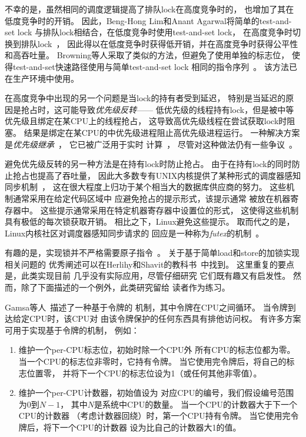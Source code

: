 不幸的是，虽然相同的调度逻辑提高了排队lock在高度竞争时的，
也增加了其在低度竞争时的开销。
因此，Beng-Hong Lim和Anant Agarwal将简单的test-and-set lock
与排队lock相结合，在低度竞争时使用test-and-set lock，
在高度竞争时切换到排队lock~\cite{BengHongLim94}，
因此得以在低度竞争时获得低开销，并在高度竞争时获得公平性和高吞吐量。
Browning等人采取了类似的方法，但避免了使用单独的标志位，
使得test-and-set快速路径使用与简单test-and-set lock
相同的指令序列~\cite{LukeBrowning2005SimpleLockNUMAAware}。
该方法已在生产环境中使用。

在高度竞争中出现的另一个问题是当lock的持有者受到延迟，
特别是当延迟的原因是抢占时，这可能导致\emph{优先级反转}——
低优先级的线程持有lock，但是被中等优先级且绑定在某CPU上的线程抢占，
这导致高优先级线程在尝试获取lock时阻塞。
结果是绑定在某CPU的中优先级进程阻止高优先级进程运行。
一种解决方案是\emph{优先级继承}~\cite{Lampson1980Mesa}，
它已被广泛用于实时
计算~\cite{LuiSha1990PriorityInheritance,JonathanCorbet2006PriorityInheritance}，
尽管对这种做法仍有一些争议~\cite{Yodaiken2004FSM,DougLocke2002a}。

避免优先级反转的另一种方法是在持有lock时防止抢占。
由于在持有lock的同时防止抢占也提高了吞吐量，
因此大多数专有UNIX内核提供了某种形式的调度器感知
同步机制~\cite{Kontothanassis97a}，
这在很大程度上归功于某个相当大的数据库供应商的努力。
这些机制通常采用在给定代码区域中
应避免抢占的提示形式，该提示通常
被放在机器寄存器中。
这些提示通常采用在特定机器寄存器中设置位的形式，
这使得这些机制具有极低的每次锁获取开销。
相比之下，Linux避免这些提示。
取而代之的是，Linux内核社区对调度器感知同步请求的
回应是一种称为\emph{futex}的机制~\cite{HubertusFrancke2002Futex,IngoMolnar2006RobustFutexes,StevenRostedt2006piFutexes,UlrichDrepper2011Futexes}。

有趣的是，实现锁并不严格需要原子指令~\cite{Dijkstra65a,Lamport74a}。
关于基于简单load和store的加锁实现相关问题的
优秀阐述可以在Herlihy和Shavit的教科书~\cite{HerlihyShavit2008Textbook,HerlihyShavit2020Textbook}中找到。
这里重复的要点是，此类实现目前
几乎没有实际应用，尽管仔细研究
它们既有趣又有启发性。
然而，除了下面描述的一个例外，此类研究留给
读者作为练习。

Gamsa等人~\cite[Section 5.3]{Gamsa99}描述了一种基于令牌的
机制，其中令牌在CPU之间循环。
当令牌到达给定CPU时，该CPU对
由该令牌保护的任何东西具有排他访问权。
有许多方案可用于实现基于令牌的机制，
例如：

\begin{enumerate}
\item	维护一个per-CPU标志位，初始时除一个CPU外
	所有CPU的标志位都为零。
	当一个CPU的标志位非零时，它持有令牌。
	当它使用完令牌后，将自己的标志位置零，
	并将下一个CPU的标志位设为1（或任何其他非零值）。
\item	维护一个per-CPU计数器，初始值设为
	对应CPU的编号，我们假设编号范围为0到$N-1$，
	其中$N$是系统中CPU的数量。
	当一个CPU的计数器大于下一个CPU的计数器
	（考虑计数器回绕）时，第一个CPU持有令牌。
	当它使用完令牌后，将下一个CPU的计数器
	设为比自己的计数器大1的值。
\end{enumerate}

